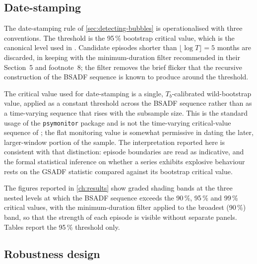  
\subsection{Date-stamping}
\label{subsec:bubble-date-stamping}
 
The date-stamping rule of \cref{sec:detecting-bubbles} is
operationalised with three conventions. The threshold is the 95\,\%
bootstrap critical value, which is the canonical level used in
\citet{phillipsShiYu2015a}. Candidate episodes shorter than
$\lfloor \log T \rfloor = 5$ months are discarded, in keeping with
the minimum-duration filter recommended in their Section~5 and
footnote~8; the filter removes the brief flicker that the recursive
construction of the BSADF sequence is known to produce around the
threshold.
 
The critical value used for date-stamping is a single,
$T_b$-calibrated wild-bootstrap value, applied as a constant
threshold across the BSADF sequence rather than as a time-varying
sequence that rises with the subsample size. This is the standard
usage of the \texttt{psymonitor} package and is not the time-varying
critical-value sequence of \citet[Section~5]{phillipsShiYu2015a};
the flat monitoring value is somewhat permissive in dating the later,
larger-window portion of the sample. The interpretation reported here
is consistent with that distinction: episode boundaries are read as
indicative, and the formal statistical inference on whether a series
exhibits explosive behaviour rests on the GSADF statistic compared
against its bootstrap critical value.
 
The figures reported in \cref{ch:results} show graded shading bands
at the three nested levels at which the BSADF sequence exceeds the
90\,\%, 95\,\% and 99\,\% critical values, with the minimum-duration
filter applied to the broadest (90\,\%) band, so that the strength
of each episode is visible without separate panels. Tables report
the 95\,\% threshold only.
 
 
\subsection{Robustness design}
\label{subsec:bubble-robustness-design}
 
